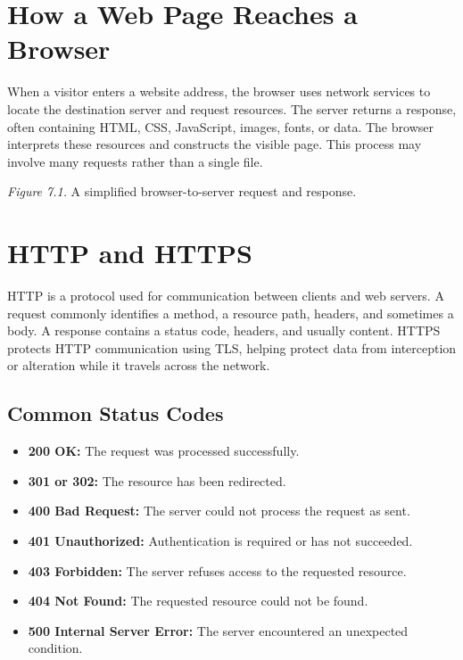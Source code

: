 \documentclass[11pt,openany,oneside]{book}
\begin{document}
\section{How a Web Page Reaches a Browser}
When a visitor enters a website address, the browser uses network services to locate the destination server and request resources. The server returns a response, often containing HTML, CSS, JavaScript, images, fonts, or data. The browser interprets these resources and constructs the visible page. This process may involve many requests rather than a single file.

\begin{center}
\end{center}
\textit{Figure 7.1.} A simplified browser-to-server request and response.

\section{HTTP and HTTPS}
HTTP is a protocol used for communication between clients and web servers. A request commonly identifies a method, a resource path, headers, and sometimes a body. A response contains a status code, headers, and usually content. HTTPS protects HTTP communication using TLS, helping protect data from interception or alteration while it travels across the network.

\subsection{Common Status Codes}
\begin{itemize}
\item \textbf{200 OK:} The request was processed successfully.
\item \textbf{301 or 302:} The resource has been redirected.
\item \textbf{400 Bad Request:} The server could not process the request as sent.
\item \textbf{401 Unauthorized:} Authentication is required or has not succeeded.
\item \textbf{403 Forbidden:} The server refuses access to the requested resource.
\item \textbf{404 Not Found:} The requested resource could not be found.
\item \textbf{500 Internal Server Error:} The server encountered an unexpected condition.
\end{itemize}
\end{document}
